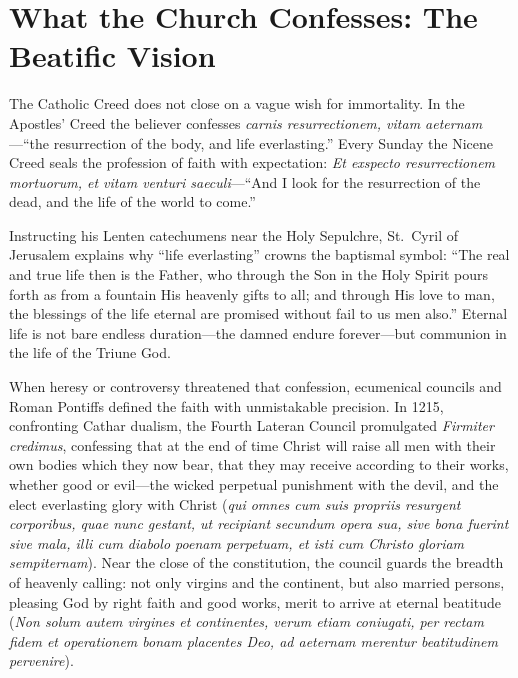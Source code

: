 \section{What the Church Confesses: The Beatific Vision}

The Catholic Creed does not close on a vague wish for immortality. In the Apostles' Creed the believer confesses \textit{carnis resurrectionem, vitam aeternam}---``the resurrection of the body, and life everlasting.'' Every Sunday the Nicene Creed seals the profession of faith with expectation: \textit{Et exspecto resurrectionem mortuorum, et vitam venturi saeculi}---``And I look for the resurrection of the dead, and the life of the world to come.''

Instructing his Lenten catechumens near the Holy Sepulchre, St.\ Cyril of Jerusalem explains why ``life everlasting'' crowns the baptismal symbol: ``The real and true life then is the Father, who through the Son in the Holy Spirit pours forth as from a fountain His heavenly gifts to all; and through His love to man, the blessings of the life eternal are promised without fail to us men also.'' Eternal life is not bare endless duration---the damned endure forever---but communion in the life of the Triune God.

When heresy or controversy threatened that confession, ecumenical councils and Roman Pontiffs defined the faith with unmistakable precision. In 1215, confronting Cathar dualism, the Fourth Lateran Council promulgated \textit{Firmiter credimus}, confessing that at the end of time Christ will raise all men with their own bodies which they now bear, that they may receive according to their works, whether good or evil---the wicked perpetual punishment with the devil, and the elect everlasting glory with Christ (\textit{qui omnes cum suis propriis resurgent corporibus, quae nunc gestant, ut recipiant secundum opera sua, sive bona fuerint sive mala, illi cum diabolo poenam perpetuam, et isti cum Christo gloriam sempiternam}). Near the close of the constitution, the council guards the breadth of heavenly calling: not only virgins and the continent, but also married persons, pleasing God by right faith and good works, merit to arrive at eternal beatitude (\textit{Non solum autem virgines et continentes, verum etiam coniugati, per rectam fidem et operationem bonam placentes Deo, ad aeternam merentur beatitudinem pervenire}).

